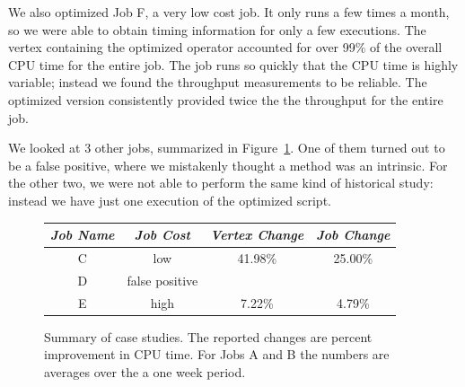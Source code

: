 We also optimized Job F, a very low cost job.
It only runs a few times a month, so we were able to obtain timing information for only a few executions.
The vertex containing the optimized operator accounted for over 99\% of the overall CPU time for the entire job.
The job runs so quickly that the CPU time is highly variable; instead we found the throughput measurements to be reliable.
The optimized version consistently provided twice the the throughput for the entire job.

We looked at 3 other jobs, summarized in Figure~\ref{fig:caseStudySummary}.
One of them turned out to be a false positive, where we mistakenly thought a method was an intrinsic.
For the other two, we were not able to perform the same kind of historical study: instead we have just one execution of the optimized script.
\begin{figure}[ht]
\begin{tabular}{c|c|c|c} 
{\em Job Name} & {\em Job Cost} & {\em Vertex Change} & {\em Job Change} \\ \hline
C & low    & 41.98\%  & 25.00\% \\
D & false positive & \\
E & high   & 7.22\%   & 4.79\%
\end{tabular}
\caption{Summary of case studies. The reported changes are percent improvement in CPU time.
For Jobs A and B the numbers are averages over the a one week period.
\label{fig:caseStudySummary}}
\end{figure}

